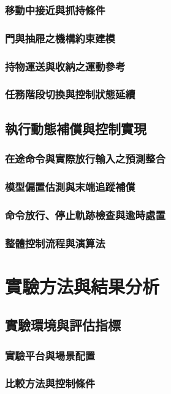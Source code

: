\subsection{移動中接近與抓持條件}
\subsection{門與抽屜之機構約束建模}
\subsection{持物運送與收納之運動參考}
\subsection{任務階段切換與控制狀態延續}

\section{執行動態補償與控制實現}
\subsection{在途命令與實際放行輸入之預測整合}
\subsection{模型偏置估測與末端追蹤補償}
\subsection{命令放行、停止軌跡檢查與逾時處置}
\subsection{整體控制流程與演算法}

\chapter{實驗方法與結果分析}

\section{實驗環境與評估指標}
\subsection{實驗平台與場景配置}
\subsection{比較方法與控制條件}
